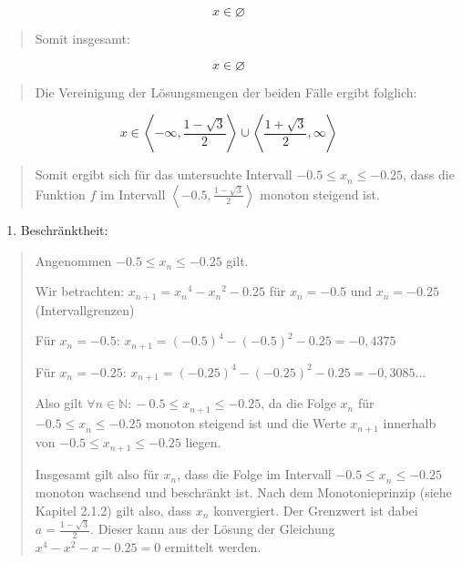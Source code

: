 \documentclass[a4paper, 12pt]{book}
\begin{document}
\begin{longtable}[]
\begin{minipage}[b]{\linewidth}
\[x \in \varnothing\]

\begin{quote}
Somit insgesamt:
\end{quote}

\[x \in \varnothing\]

\begin{quote}
Die Vereinigung der Lösungsmengen der beiden Fälle ergibt folglich:
\end{quote}

\[x \in \left\langle  - \infty,\frac{1 - \sqrt{3}}{2} \right\rangle \cup \left\langle \frac{1 + \sqrt{3}}{2},\infty \right\rangle\]

\begin{quote}
Somit ergibt sich für das untersuchte Intervall
\(- 0.5{\leq x}_{n} \leq  - 0.25\), dass die Funktion \(f\) im
Intervall
\(\left\langle - 0.5,\frac{1 - \sqrt{3}}{2} \right\rangle\)
monoton steigend ist.
\end{quote}

\begin{enumerate}
\def\labelenumi{\arabic{enumi})}
\setcounter{enumi}{1}
\item
  Beschränktheit:
\end{enumerate}

\begin{quote}
Angenommen \(- 0.5{\leq x}_{n} \leq  - 0.25\) gilt.

Wir betrachten:
\(x_{n + 1} = {x_{n}}^{4} - {x_{n}}^{2} - 0.25\) für
\(x_{n} =  - 0.5\) und \(x_{n} =  - 0.25\) (Intervallgrenzen)

Für \(x_{n} =  - 0.5\):
\(x_{n + 1} = {( - 0.5)}^{4} - {( - 0.5)}^{2} - 0.25 =  - 0,4375\)

Für \(x_{n} =  - 0.25\):
\(x_{n + 1} = {( - 0.25)}^{4} - {( - 0.25)}^{2} - 0.25 =  - 0,3085...\)

Also gilt
\(\forall n \in \mathbb{N:} - 0.5{\leq x}_{n + 1} \leq  - 0.25\),
da die Folge \(x_{n}\) für
\(- 0.5{\leq x}_{n} \leq  - 0.25\) monoton steigend ist und
die Werte \({x}_{n + 1}\) innerhalb von
\(- 0.5{\leq x}_{n + 1} \leq  - 0.25\) liegen.

Insgesamt gilt also für \(x_{n}\), dass die Folge im Intervall
\(- 0.5{\leq x}_{n} \leq  - 0.25\) monoton wachsend und
beschränkt ist. Nach dem Monotonieprinzip (siehe Kapitel 2.1.2) gilt
also, dass \(x_{n}\) konvergiert. Der Grenzwert ist dabei
\(a = \frac{1 - \sqrt{3}}{2}\). Dieser kann aus der Lösung der
Gleichung \(x^{4} - x^{2} - x - 0.25 = 0\) ermittelt
werden.
\end{quote}


\end{minipage}
\end{longtable}
\end{document}
